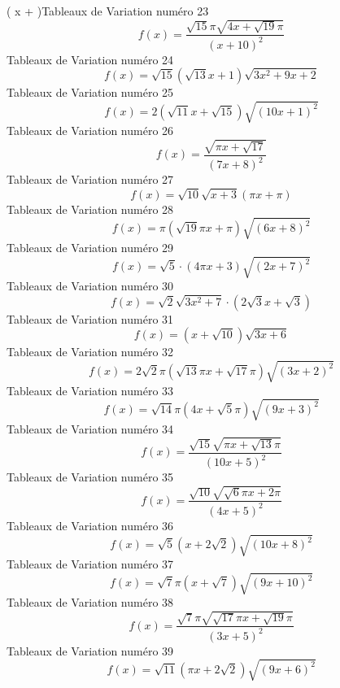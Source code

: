 \documentclass{article}
\begin{document}
\left( \pi x +  \pi\right)\]Tableaux de Variation num\'ero 23 \[f(x) = \frac{\sqrt{15} \pi \sqrt{4 x + \sqrt{19} \pi}}{\left(x + 10\right)^{2}}\]Tableaux de Variation num\'ero 24 \[f(x) = \sqrt{15} \left(\sqrt{13} x + 1\right) \sqrt{3 x^{2} + 9 x + 2}\]Tableaux de Variation num\'ero 25 \[f(x) = 2 \left(\sqrt{11} x + \sqrt{15}\right) \sqrt{\left(10 x + 1\right)^{2}}\]Tableaux de Variation num\'ero 26 \[f(x) = \frac{\sqrt{\pi x + \sqrt{17}}}{\left(7 x + 8\right)^{2}}\]Tableaux de Variation num\'ero 27 \[f(x) = \sqrt{10} \sqrt{x + 3} \left(\pi x + \pi\right)\]Tableaux de Variation num\'ero 28 \[f(x) = \pi \left(\sqrt{19} \pi x + \pi\right) \sqrt{\left(6 x + 8\right)^{2}}\]Tableaux de Variation num\'ero 29 \[f(x) = \sqrt{5} \cdot \left(4 \pi x + 3\right) \sqrt{\left(2 x + 7\right)^{2}}\]Tableaux de Variation num\'ero 30 \[f(x) = \sqrt{2} \sqrt{3 x^{2} + 7} \cdot \left(2 \sqrt{3} x + \sqrt{3}\right)\]Tableaux de Variation num\'ero 31 \[f(x) = \left(x + \sqrt{10}\right) \sqrt{3 x + 6}\]Tableaux de Variation num\'ero 32 \[f(x) = 2 \sqrt{2} \pi \left(\sqrt{13} \pi x + \sqrt{17} \pi\right) \sqrt{\left(3 x + 2\right)^{2}}\]Tableaux de Variation num\'ero 33 \[f(x) = \sqrt{14} \pi \left(4 x + \sqrt{5} \pi\right) \sqrt{\left(9 x + 3\right)^{2}}\]Tableaux de Variation num\'ero 34 \[f(x) = \frac{\sqrt{15} \sqrt{\pi x + \sqrt{13} \pi}}{\left(10 x + 5\right)^{2}}\]Tableaux de Variation num\'ero 35 \[f(x) = \frac{\sqrt{10} \sqrt{\sqrt{6} \pi x + 2 \pi}}{\left(4 x + 5\right)^{2}}\]Tableaux de Variation num\'ero 36 \[f(x) = \sqrt{5} \left(x + 2 \sqrt{2}\right) \sqrt{\left(10 x + 8\right)^{2}}\]Tableaux de Variation num\'ero 37 \[f(x) = \sqrt{7} \pi \left(x + \sqrt{7}\right) \sqrt{\left(9 x + 10\right)^{2}}\]Tableaux de Variation num\'ero 38 \[f(x) = \frac{\sqrt{7} \pi \sqrt{\sqrt{17} \pi x + \sqrt{19} \pi}}{\left(3 x + 5\right)^{2}}\]Tableaux de Variation num\'ero 39 \[f(x) = \sqrt{11} \left(\pi x + 2 \sqrt{2}\right) \sqrt{\left(9 x + 6\right)^{2}}\]
\end{document}
